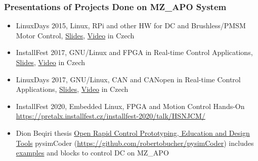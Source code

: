 \documentclass{beamer}
\begin{document}
\begin{frame}
\frametitle{Presentations of Projects Done on MZ\_APO System}

\begin{itemize}
\item LinuxDays 2015, Linux, RPi and other HW for DC and Brushless/PMSM Motor Control,
\href{https://www.linuxdays.cz/2015/video/Pavel_Pisa-Rizeni_stejnosmernych_motoru.pdf}{Slides},
\href{https://youtu.be/uMfY-sKf0HA}{Video} in Czech

\item InstallFest 2017, GNU/Linux and FPGA in Real-time Control Applications,
\href{https://installfest.cz/if17/slides/so_t2_pisa_realtime.pdf}{Slides},
\href{https://youtu.be/sNtlEysC0yA}{Video} in Czech

\item  LinuxDays 2017, GNU/Linux, CAN and CANopen in Real-time Control
Applications,
\href{https://www.linuxdays.cz/2017/video/Pavel_Pisa-CAN_canopen.pdf}{Slides},
\href{https://youtu.be/hYC-XznyOlQ}{Video} in Czech

\item InstallFest 2020, Embedded Linux, FPGA and Motion Control Hands-On
\url{https://pretalx.installfest.cz/installfest-2020/talk/HSNJCM/}

\item Dion Beqiri thesis
\href{https://dspace.cvut.cz/bitstream/handle/10467/101599/F3-BP-2022-Beqiri-Dion-bachelor_thesis_DionBeqiri.pdf}{Open Rapid Control Prototyping, Education and Design Tools} pysimCoder
(\url{https://github.com/robertobucher/pysimCoder}) includes
\href{https://github.com/robertobucher/pysimCoder-examples/tree/main/Linux-mzapo/DCmotor}{examples}
and blocks to control DC on MZ\_APO

\end{itemize}

\end{frame}
\end{document}
